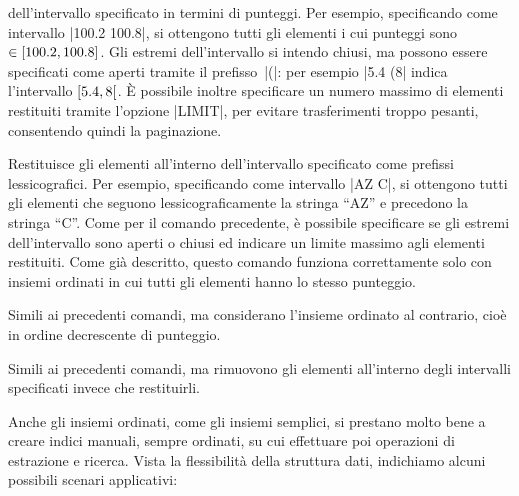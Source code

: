 \begin{description}[style=nextline,font={\bfseries\ttfamily}]
		dell'intervallo specificato in termini di punteggi. Per esempio, specificando come
		intervallo \cverb|100.2 100.8|, si ottengono tutti gli elementi i cui punteggi sono $\in
		\interval{100.2}{100.8}$. Gli estremi dell'intervallo si intendo chiusi, ma possono essere
		specificati come aperti tramite il pre\-fis\-so~\cverb|(|: per esempio \cverb|5.4 (8|
		indica l'intervallo $\interval[open right]{5.4}{8}$. È possibile inoltre specificare un
		numero massimo di elementi restituiti tramite l'opzione \cverb|LIMIT|, per evitare
		trasferimenti troppo pesanti, consentendo quindi la paginazione.
	\item[{ZRANGEBYLEX key min max [LIMIT offset count]}] Restituisce gli elementi all'interno
		dell'intervallo specificato come prefissi lessicografici. Per esempio, specificando come
		intervallo \cverb|AZ C|, si ottengono tutti gli elementi che seguono lessicograficamente
		la stringa ``AZ'' e precedono la stringa ``C''. Come per il comando precedente, è possibile
		specificare se gli estremi dell'intervallo sono aperti o chiusi ed indicare un limite
		massimo agli elementi restituiti. Come già descritto, questo comando funziona correttamente
		solo con insiemi ordinati in cui tutti gli elementi hanno lo stesso punteggio.
	\item[ZREVRANGE / ZREVRANGEBYSCORE / ZREVRANGEBYLEX] Simili ai precedenti comandi, ma
		considerano l'insieme or\-di\-na\-to al contrario, cioè in ordine decrescente di punteggio.
	\item[ZREMRANGEBYRANK / ZREMRANGEBYSCORE / ZREMRANGEBYLEX] Simili ai precedenti comandi, ma
		rimuovono gli elementi al\-l'in\-ter\-no degli intervalli specificati invece che restituirli.
\end{description}

Anche gli insiemi ordinati, come gli insiemi semplici, si prestano molto bene a creare indici manuali,
sempre ordinati, su cui effettuare poi operazioni di estrazione e ricerca. Vista la flessibilità
della struttura dati, indichiamo alcuni possibili scenari applicativi:

